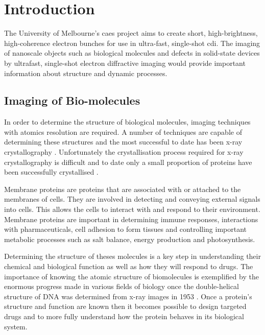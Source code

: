 \chapter{Introduction}

The University of Melbourne's \gls{caes} project aims to create short, high-brightness, high-coherence electron bunches for use in ultra-fast, single-shot \gls{cdi}. The imaging of nanoscale objects such as biological molecules \cite{dwyer_femtosecond_2006, williamson_clocking_1997} and defects in solid-state devices \cite{siwick_atomic-level_2003} by ultrafast, single-shot electron diffractive imaging would provide important information about structure and dynamic processes.

\section{Imaging of Bio-molecules}

In order to determine the structure of biological molecules, imaging techniques with atomics resolution are required. A number of techniques are capable of determining these structures \cite{nettleship_methods_2008, svergun_small-angle_2003, opella_structure_2004} and the most successful to date has been x-ray crystallography \cite{kendrew_three-dimensional_1958, uson_advances_1999}. Unfortunately the crystallisation process required for x-ray crystallography is difficult and to date only a small proportion of proteins have been successfully crystallised \cite{geerlof_impact_2006}.

Membrane proteins are proteins that are associated with or attached to the membranes of cells. They are involved in detecting and conveying external signals into cells. This allows the cells to interact with and respond to their environment\cite{almen_mapping_2009}. Membrane proteins are important in determining immune responses, interactions with pharmaceuticals, cell adhesion to form tissues and controlling important metabolic processes such as salt balance, energy production and photosynthesis\cite{chiras_human_2011}.

Determining the structure of theses molecules is a key step in understanding their chemical and biological function as well as how they will respond to drugs. The importance of knowing the atomic structure of biomolecules is exemplified by the enormous progress made in various fields of biology once the double-helical structure of DNA was determined from x-ray images in 1953 \cite{watson_molecular_1953}. Once a protein's structure and function are known then it becomes possible to design targeted drugs \cite{pinto_influenza_1992} and to more fully understand how the protein behaves in its biological system.

